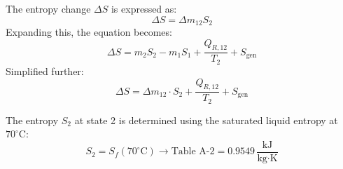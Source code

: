 The entropy change \( \Delta S \) is expressed as:  
\[
\Delta S = \Delta m_{12} S_2
\]  
Expanding this, the equation becomes:  
\[
\Delta S = m_2 S_2 - m_1 S_1 + \frac{Q_{R,12}}{T_2} + S_{\text{gen}}
\]  
Simplified further:  
\[
\Delta S = \Delta m_{12} \cdot S_2 + \frac{Q_{R,12}}{T_2} + S_{\text{gen}}
\]  

The entropy \( S_2 \) at state 2 is determined using the saturated liquid entropy at \( 70^\circ\text{C} \):  
\[
S_2 = S_f(70^\circ\text{C}) \rightarrow \text{Table A-2} = 0.9549 \, \frac{\text{kJ}}{\text{kg·K}}
\]